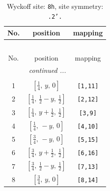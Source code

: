 \documentclass[fleqn,8pt]{jsarticle}
\begin{document}
\begin{longtable}{ccc}
\caption{Wyckoff site: {\tt 8h}, site symmetry: {\tt .2'.}}
 \\
 \hline \hline
No. & position & mapping \\ \hline \endfirsthead

\multicolumn{2}{l}{\tablename\ \thetable{}} \\
 \hline \hline
No. & position & mapping \\ \hline \endhead

 \hline \hline
\multicolumn{2}{r}{\footnotesize\it continued ...} \\ \endfoot

 \hline \hline
\multicolumn{2}{r}{} \\ \endlastfoot

1 & $\left[ \frac{1}{4},\, y,\, 0 \right]$ & {\tt [1,11]} \\ \hline
2 & $\left[ \frac{1}{4},\, \frac{1}{2} - y,\, \frac{1}{2} \right]$ & {\tt [2,12]} \\ \hline
3 & $\left[ \frac{1}{4},\, y + \frac{1}{2},\, \frac{1}{2} \right]$ & {\tt [3,9]} \\ \hline
4 & $\left[ \frac{1}{4},\, - y,\, 0 \right]$ & {\tt [4,10]} \\ \hline
5 & $\left[ \frac{3}{4},\, - y,\, 0 \right]$ & {\tt [5,15]} \\ \hline
6 & $\left[ \frac{3}{4},\, y + \frac{1}{2},\, \frac{1}{2} \right]$ & {\tt [6,16]} \\ \hline
7 & $\left[ \frac{3}{4},\, \frac{1}{2} - y,\, \frac{1}{2} \right]$ & {\tt [7,13]} \\ \hline
8 & $\left[ \frac{3}{4},\, y,\, 0 \right]$ & {\tt [8,14]} \\
\end{longtable}
\renewcommand{\arraystretch}{1.2}
\end{document}
